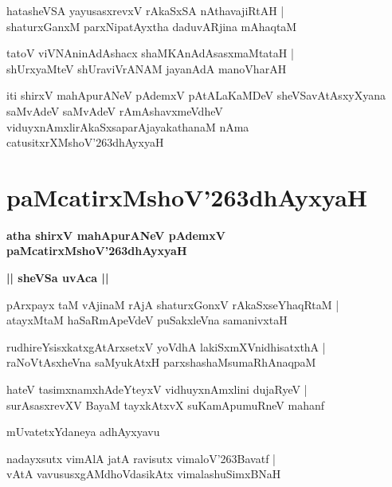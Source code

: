 \documentclass[twoside,12pt,openright]{book}
\def\S{\char'263}
\newcounter{shloka}[chapter]
\def\uvaca#1{\centerline{{\large\textbf{#1}}}}
\begin{document}
\begin{shloka}%
hatasheVSA yayusasxrevxV rAkaSxSA nAthavajiRtAH |\\
shaturxGanxM parxNipatAyxtha daduvARjina mAhaqtaM 
\end{shloka}

\begin{shloka}%
tatoV viVNAninAdAshacx shaMKAnAdAsasxmaMtataH |\\
shUrxyaMteV shUraviVrANAM jayanAdA manoVharAH
\end{shloka}

\begin{center}
iti shirxV mahApurANeV pAdemxV pAtALaKaMDeV sheVSavAtAsxyXyana saMvAdeV 
saMvAdeV rAmAshavxmeVdheV viduyxnAmxlirAkaSxsaparAjayakathanaM nAma catusitxrXMshoV\S dhAyxyaH
\end{center}

\chapter{paMcatirxMshoV\S dhAyxyaH}

\begin{center}
{\LARGE\bfseries atha shirxV mahApurANeV pAdemxV paMcatirxMshoV\S dhAyxyaH}
\end{center}

\uvaca{|| sheVSa uvAca ||}

\begin{shloka}%
pArxpayx taM vAjinaM rAjA shaturxGonxV rAkaSxseYhaqRtaM |\\
atayxMtaM haSaRmApeVdeV puSakxleVna samanivxtaH 
\end{shloka}

\begin{shloka}%
rudhireYsisxkatxgAtArxsetxV yoVdhA lakiSxmXVnidhisatxthA |\\
raNoVtAsxheVna saMyukAtxH  parxshashaMsumaRhAnaqpaM 
\end{shloka}

\begin{shloka}%
hateV tasimxnamxhAdeYteyxV vidhuyxnAmxlini dujaRyeV |\\
surAsasxrevXV BayaM tayxkAtxvX suKamApumuRneV mahanf 
\end{shloka}

\begin{center}
mUvatetxYdaneya adhAyxyavu
\end{center}

\begin{shloka}%
nadayxsutx vimAlA jatA ravisutx vimaloV\S Bavatf |\\
vAtA vavususxgAMdhoVdasikAtx vimalashuSimxBNaH 
\end{shloka}
\end{document}
